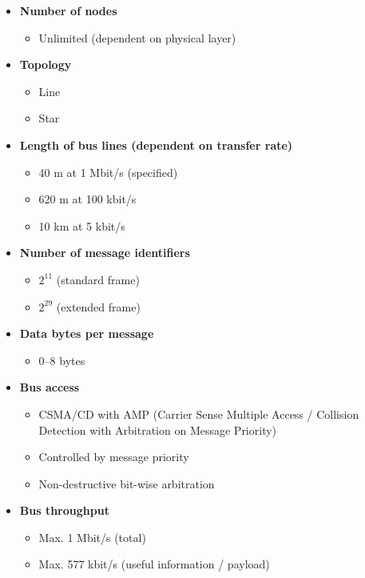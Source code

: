 \begin{itemize}
    \item \textbf{Number of nodes}
    \begin{itemize}
        \item Unlimited (dependent on physical layer)
    \end{itemize}

    \item \textbf{Topology}
    \begin{itemize}
        \item Line
        \item Star
    \end{itemize}

    \item \textbf{Length of bus lines (dependent on transfer rate)}
    \begin{itemize}
        \item 40 m at 1 Mbit/s (specified)
        \item 620 m at 100 kbit/s
        \item 10 km at 5 kbit/s
    \end{itemize}

    \item \textbf{Number of message identifiers}
    \begin{itemize}
        \item $2^{11}$ (standard frame)
        \item $2^{29}$ (extended frame)
    \end{itemize}

    \item \textbf{Data bytes per message}
    \begin{itemize}
        \item 0--8 bytes
    \end{itemize}

    \item \textbf{Bus access}
    \begin{itemize}
        \item CSMA/CD with AMP (Carrier Sense Multiple Access / Collision Detection with Arbitration on Message Priority)
        \item Controlled by message priority
        \item Non-destructive bit-wise arbitration
    \end{itemize}

    \item \textbf{Bus throughput}
    \begin{itemize}
        \item Max. 1 Mbit/s (total)
        \item Max. 577 kbit/s (useful information / payload)
    \end{itemize}


\end{itemize}
